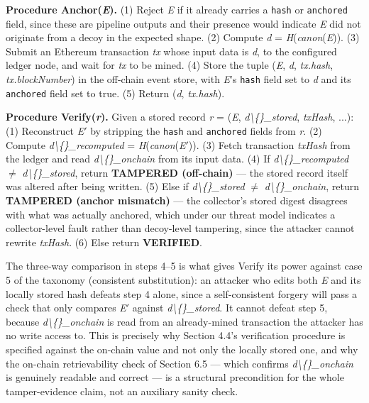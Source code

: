 \documentclass[journal]{IEEEtran}
\begin{document}
\textbf{Procedure Anchor(\emph{E}).} (1) Reject \emph{E} if it already carries a \texttt{hash} or \texttt{anchored} field, since these are pipeline outputs and their presence would indicate \emph{E} did not originate from a decoy in the expected shape. (2) Compute \emph{d} = \emph{H}(\emph{canon}(\emph{E})). (3) Submit an Ethereum transaction \emph{tx} whose input data is \emph{d}, to the configured ledger node, and wait for \emph{tx} to be mined. (4) Store the tuple (\emph{E}, \emph{d}, \emph{tx.hash}, \emph{tx.blockNumber}) in the off-chain event store, with \emph{E}'s \texttt{hash} field set to \emph{d} and its \texttt{anchored} field set to true. (5) Return (\emph{d}, \emph{tx.hash}).

\textbf{Procedure Verify(\emph{r}).} Given a stored record \emph{r} = (\emph{E}, \emph{d\textbackslash\{\}\_stored}, \emph{txHash}, ...): (1) Reconstruct \emph{E$'$} by stripping the \texttt{hash} and \texttt{anchored} fields from \emph{r}. (2) Compute \emph{d\textbackslash\{\}\_recomputed} = \emph{H}(\emph{canon}(\emph{E$'$})). (3) Fetch transaction \emph{txHash} from the ledger and read \emph{d\textbackslash\{\}\_onchain} from its input data. (4) If \emph{d\textbackslash\{\}\_recomputed} $\neq$ \emph{d\textbackslash\{\}\_stored}, return \textbf{TAMPERED (off-chain)} --- the stored record itself was altered after being written. (5) Else if \emph{d\textbackslash\{\}\_stored} $\neq$ \emph{d\textbackslash\{\}\_onchain}, return \textbf{TAMPERED (anchor mismatch)} --- the collector's stored digest disagrees with what was actually anchored, which under our threat model indicates a collector-level fault rather than decoy-level tampering, since the attacker cannot rewrite \emph{txHash}. (6) Else return \textbf{VERIFIED}.

The three-way comparison in steps 4--5 is what gives Verify its power against case 5 of the taxonomy (consistent substitution): an attacker who edits both \emph{E} and its locally stored hash defeats step 4 alone, since a self-consistent forgery will pass a check that only compares \emph{E$'$} against \emph{d\textbackslash\{\}\_stored}. It cannot defeat step 5, because \emph{d\textbackslash\{\}\_onchain} is read from an already-mined transaction the attacker has no write access to. This is precisely why Section 4.4's verification procedure is specified against the on-chain value and not only the locally stored one, and why the on-chain retrievability check of Section 6.5 --- which confirms \emph{d\textbackslash\{\}\_onchain} is genuinely readable and correct --- is a structural precondition for the whole tamper-evidence claim, not an auxiliary sanity check.
\end{document}
